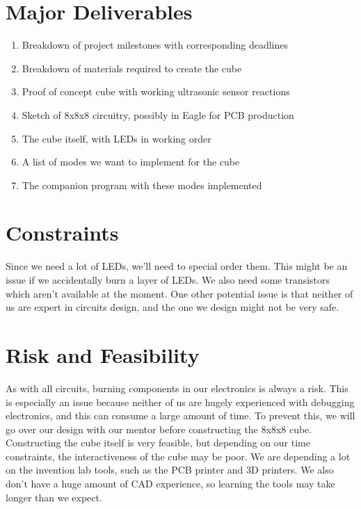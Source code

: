 \documentclass[10pt]{article}
\begin{document}
  \section{Major Deliverables}
    \begin{enumerate}[topsep=0ex]
    \itemsep0em
    \item Breakdown of project milestones with corresponding deadlines
    \item Breakdown of materials required to create the cube
    \item Proof of concept cube with working ultrasonic sensor reactions
    \item Sketch of 8x8x8 circuitry, possibly in Eagle for PCB production
    \item The cube itself, with LEDs in working order
    \item A list of modes we want to implement for the cube
    \item The companion program with these modes implemented
    \end{enumerate}

  \section{Constraints}
    Since we need a lot of LEDs, we'll need to special order them. This might be an issue if we accidentally burn a layer of LEDs. We also need some transistors which aren't available at the moment. One other potential issue is that neither of us are expert in circuits design, and the one we design might not be very safe.
  \section{Risk and Feasibility}
    As with all circuits, burning components in our electronics is always a risk. This is especially an issue because neither of us are hugely experienced with debugging electronics, and this can consume a large amount of time. To prevent this, we will go over our design with our mentor before constructing the 8x8x8 cube. Constructing the cube itself is very feasible, but depending on our time constraints, the interactiveness of the cube may be poor. We are depending a lot on the invention lab tools, such as the PCB printer and 3D printers. We also don't have a huge amount of CAD experience, so learning the tools may take longer than we expect.
\end{document}
